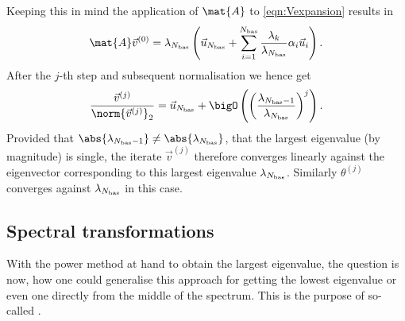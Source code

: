 Keeping this in mind the application of $\mat{A}$ to \eqref{eqn:Vexpansion}
results in
\[
	\mat{A} \vec{v}^{(0)} = \lambda_{\Nbas} \left( \vec{u}_{\Nbas} + \sum_{i=1}^{\Nbas}
	\frac{\lambda_k}{\lambda_{\Nbas}}
	\alpha_i \vec{u}_i \right).
\]
After the $j$-th step and subsequent normalisation we hence get
\[
	\frac{\vec{v}^{(j)}}{\norm{\vec{v}^{(j)}}_2} =
	\vec{u}_{\Nbas} + \bigO\left(
	\left( \frac{\lambda_{\Nbas-1}}{\lambda_{\Nbas}} \right)^j
	\right).
\]
Provided that $\abs{\lambda_{\Nbas-1}} \neq \abs{\lambda_{\Nbas}}$,
\ie that the largest eigenvalue (by magnitude) is single,
the iterate $\vec{v}^{(j)}$
therefore converges linearly against the eigenvector corresponding to this
largest eigenvalue $\lambda_{N_\text{bas}}$.
Similarly $\theta^{(j)}$ converges against $\lambda_{N_\text{bas}}$ in this case.


\subsection{Spectral transformations}
\label{sec:ShiftInvert}
With the power method at hand to obtain the largest eigenvalue,
the question is now,
how one could generalise this approach
for getting the lowest eigenvalue or even one directly from the middle
of the spectrum.
This is the purpose of so-called .


